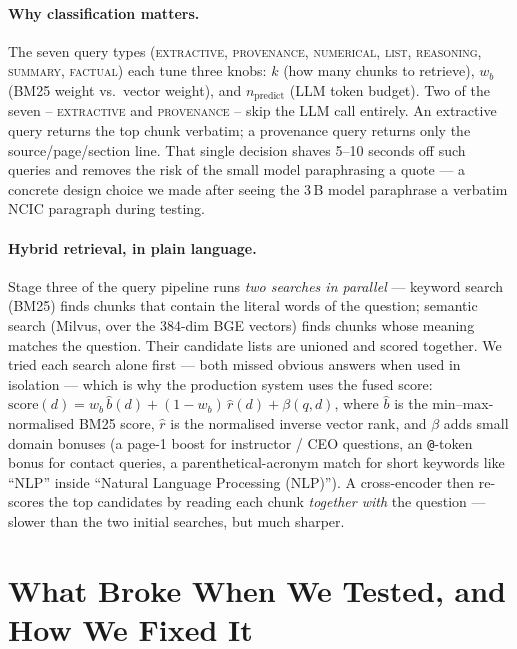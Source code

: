 \documentclass[11pt,a4paper]{article}
\begin{document}
\paragraph{Why classification matters.}
The seven query types (\textsc{extractive}, \textsc{provenance},
\textsc{numerical}, \textsc{list}, \textsc{reasoning}, \textsc{summary},
\textsc{factual}) each tune three knobs: $k$ (how many chunks to retrieve),
$w_b$ (BM25 weight vs.\ vector weight), and $n_\textrm{predict}$ (LLM token
budget). Two of the seven -- \textsc{extractive} and \textsc{provenance} --
skip the LLM call entirely. An extractive query returns the top chunk
verbatim; a provenance query returns only the source/page/section line.
That single decision shaves 5--10 seconds off such queries and removes the
risk of the small model paraphrasing a quote --- a concrete design choice
we made after seeing the 3\,B model paraphrase a verbatim NCIC paragraph
during testing.

\paragraph{Hybrid retrieval, in plain language.}
Stage three of the query pipeline runs \emph{two searches in parallel} ---
keyword search (BM25) finds chunks that contain the literal words of the
question; semantic search (Milvus, over the 384-dim BGE vectors) finds
chunks whose meaning matches the question. Their candidate lists are
unioned and scored together. We tried each search alone first --- both
missed obvious answers when used in isolation --- which is why the
production system uses the fused score:
$\mathrm{score}(d) = w_b\,\widehat{b}(d) + (1-w_b)\,\widehat{r}(d) + \beta(q,d)$,
where $\widehat{b}$ is the min--max-normalised BM25 score, $\widehat{r}$
is the normalised inverse vector rank, and $\beta$ adds small domain
bonuses (a page-1 boost for instructor / CEO questions, an
\texttt{@}-token bonus for contact queries, a parenthetical-acronym match
for short keywords like ``NLP'' inside ``Natural Language Processing
(NLP)''). A cross-encoder then re-scores the top candidates by reading
each chunk \emph{together with} the question --- slower than the two
initial searches, but much sharper.

\section{What Broke When We Tested, and How We Fixed It}
\label{sec:problems}
\end{document}
